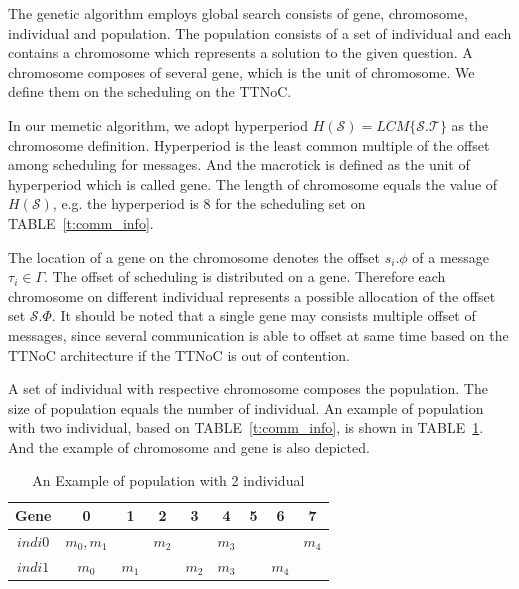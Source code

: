 \documentclass[journal]{IEEEtran}
\newcommand{\calS}{\mathcal{S}}
\newcommand{\calT}{\mathcal{T}}
\begin{document}
The genetic algorithm employs global search consists of gene, chromosome,
 individual and population. 
The population consists of a set of individual and each contains a chromosome which represents a solution to the given question. 
A chromosome composes of several gene,
 which is the unit of chromosome.
We define them on the scheduling on the TTNoC.

In our memetic algorithm,
 we adopt hyperperiod  $H(\calS) = LCM\{\calS.\calT\}$
 as the chromosome definition.
Hyperperiod is the least common multiple of the offset among scheduling for messages. 
And the macrotick is defined as the unit of hyperperiod which is called gene.
The length of chromosome equals the value of $H(\calS)$,
 e.g. the hyperperiod is 8 for the scheduling set on TABLE~\ref{t:comm_info}. 

The location of a gene on the chromosome denotes the offset $ s_i.\phi $ of a message $\tau_i\in\Gamma$.
The offset of scheduling is distributed on a gene.
Therefore each chromosome on different individual represents a possible allocation of the offset set $\calS.\Phi$.
It should be noted that a single gene may consists multiple offset of messages,
 since several communication is able to offset at same time based on the TTNoC architecture if the TTNoC is out of contention.

A set of individual with respective chromosome composes the population.
The size of population equals the number of individual.
An example of population with two individual,
 based on TABLE~\ref{t:comm_info},
  is shown in TABLE~\ref{t:pop}.
And the example of chromosome and gene is also depicted.
\begin{table}[!t]
	\renewcommand{\arraystretch}{1.3}
	\caption{An Example of population with 2 individual}
	\label{t:pop}
	\centering
	\begin{tabular}{|c||c||c||c||c||c||c||c||c|}
	\hline
		\textbf{Gene}& 
		\textbf{0} & 
		\textbf{1} & 
		\textbf{2} & 
		\textbf{3} &
		\textbf{4} & 
		\textbf{5} & 
		\textbf{6} & 
		\textbf{7} \\		
	\hline
		$indi0$	&$m_0,m_1$&	&$m_2$&	&$m_3$& & &$m_4$\\		
	\hline		
		$indi1$	&$m_0$&$m_1$&	&$m_2$&$m_3$& &$m_4$&	\\		
	\hline
	\end{tabular}
\end{table}
\end{document}
